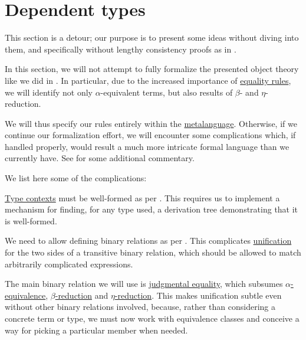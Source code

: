 \section{Dependent types}\label{sec:dependent_types}

This section is a detour; our purpose is to present some ideas without diving into them, and specifically without lengthy consistency proofs as in .

\begin{remark}\label{rem:dependent_type_rule_formalization}
  In this section, we will not attempt to fully formalize the presented object theory like we did in . In particular, due to the increased importance of \hyperref[rem:type_theory_rule_classification/equality]{equality rules}, we will identify not only \( \alpha \)-equivalent terms, but also results of \( \beta \)- and \( \eta \)-reduction.

  We will thus specify our rules entirely within the \hyperref[con:metalanguage]{metalanguage}. Otherwise, if we continue our formalization effort, we will encounter some complications which, if handled properly, would result a much more intricate formal language than we currently have. See  for some additional commentary.

  We list here some of the complications:
  \begin{thmenum}
     \hyperref[def:type_context]{Type contexts} must be well-formed as per . This requires us to implement a mechanism for finding, for any type used, a derivation tree demonstrating that it is well-formed.

     We need to allow defining binary relations as per . This complicates \hyperref[con:unification]{unification} for the two sides of a transitive binary relation, which should be allowed to match arbitrarily complicated expressions.

     The main binary relation we will use is \hyperref[con:equality]{judgmental equality}, which subsumes \hyperref[def:lambda_term_alpha_equivalence]{\( \alpha \)-equivalence}, \hyperref[def:typed_term_reduction]{\( \beta \)-reduction} and \hyperref[def:typed_term_reduction]{\( \eta \)-reduction}. This makes unification subtle even without other binary relations involved, because, rather than considering a concrete term or type, we must now work with equivalence classes and conceive a way for picking a particular member when needed.


\end{thmenum}
\end{remark}
